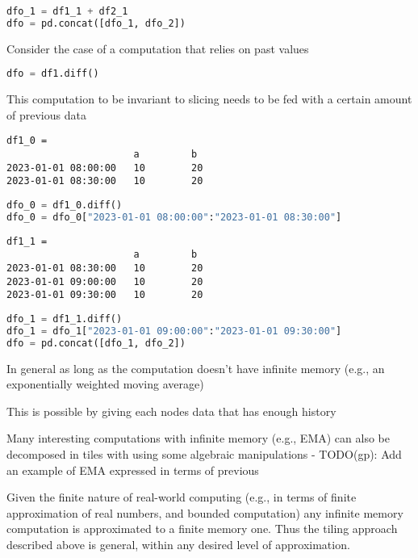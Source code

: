 \documentclass[11pt, reqno]{amsart}
\theoremstyle{definition}
\theoremstyle{remark}
\begin{document}
\begin{lstlisting}[language=Python]
dfo_1 = df1_1 + df2_1
dfo = pd.concat([dfo_1, dfo_2])
\end{lstlisting}

Consider the case of a computation that relies on past values

\begin{lstlisting}[language=Python]
dfo = df1.diff()
\end{lstlisting}

This computation to be invariant to slicing needs to be fed with a
certain amount of previous data

\begin{verbatim}
df1_0 =
                      a         b
2023-01-01 08:00:00   10        20
2023-01-01 08:30:00   10        20
\end{verbatim}

\begin{lstlisting}[language=Python]
dfo_0 = df1_0.diff()
dfo_0 = dfo_0["2023-01-01 08:00:00":"2023-01-01 08:30:00"]
\end{lstlisting}

\begin{verbatim}
df1_1 =
                      a         b
2023-01-01 08:30:00   10        20
2023-01-01 09:00:00   10        20
2023-01-01 09:30:00   10        20
\end{verbatim}

\begin{lstlisting}[language=Python]
dfo_1 = df1_1.diff()
dfo_1 = dfo_1["2023-01-01 09:00:00":"2023-01-01 09:30:00"]
dfo = pd.concat([dfo_1, dfo_2])
\end{lstlisting}

In general as long as the computation doesn't have infinite memory
(e.g., an exponentially weighted moving average)

This is possible by giving each nodes data that has enough history

Many interesting computations with infinite memory (e.g., EMA) can also
be decomposed in tiles with using some algebraic manipulations -
TODO(gp): Add an example of EMA expressed in terms of previous

Given the finite nature of real-world computing (e.g., in terms of
finite approximation of real numbers, and bounded computation) any
infinite memory computation is approximated to a finite memory one. Thus
the tiling approach described above is general, within any desired level
of approximation.
\end{document}

